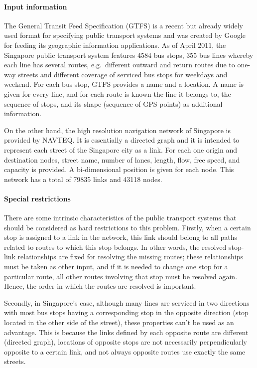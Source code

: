 \paragraph{Input information}

The General Transit Feed Specification (GTFS) is a recent but already widely used format for specifying public transport systems and was created by Google for feeding its geographic information applications. As of April 2011, the Singapore public transport system features 4584 bus stops, 355 bus lines whereby each line has several routes, e.g.\ different outward and return routes due to one-way streets and different coverage of serviced bus stops for weekdays and weekend. For each bus stop, GTFS provides a name and a location. A name is given for every line, and for each route is known the line it belongs to, the sequence of stops, and its shape (sequence of GPS points) as additional information.

On the other hand, the high resolution navigation network of Singapore is provided by NAVTEQ. It is essentially a directed graph and it is intended to represent each street of the Singapore city as a link. For each one origin and destination nodes, street name, number of lanes, length, flow, free speed, and capacity is provided. A bi-dimensional position is given for each node. This network has a total of 79835 links and 43118 nodes.

\paragraph{Special restrictions}

There are some intrinsic characteristics of the public transport systems that should be considered as hard restrictions to this problem. Firstly, when a certain stop is assigned to a link in the network, this link should belong to all paths related to routes to which this stop belongs. In other words, the resolved stop-link relationships are fixed for resolving the missing routes; these relationships must be taken as other input, and if it is needed to change one stop for a particular route, all other routes involving that stop must be resolved again. Hence, the order in which the routes are resolved is important.

Secondly, in Singapore's case, although many lines are serviced in two directions with most bus stops having a corresponding stop in the opposite direction (stop located in the other side of the street), these properties can't be used as an advantage. This is because the links defined by each opposite route are different (directed graph), locations of opposite stops are not necessarily perpendicularly opposite to a certain link, and not always opposite routes use exactly the same streets.

